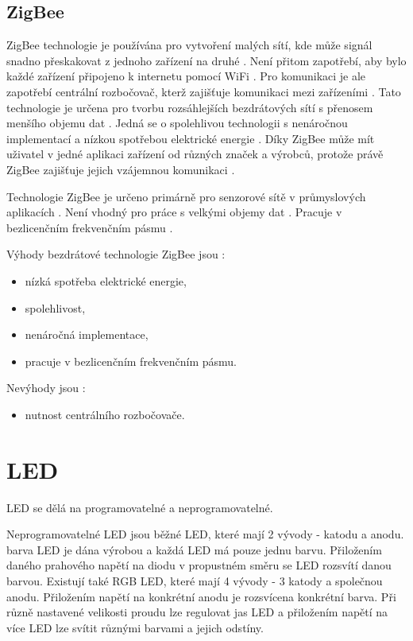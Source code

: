 \subsection{ZigBee}
ZigBee technologie je používána pro vytvoření malých sítí, kde může signál snadno přeskakovat z jednoho zařízení na druhé \cite{ZigBee_smart}.
Není přitom zapotřebí, aby bylo každé zařízení připojeno k internetu pomocí WiFi \cite{ZigBee_smart}. Pro komunikaci je ale zapotřebí centrální 
rozbočovač, kterž zajišťuje komunikaci mezi zařízeními \cite{ZigBee_smart}. Tato technologie je určena pro tvorbu rozsáhlejších bezdrátových sítí
s přenosem menšího objemu dat \cite{ZigBee_smart}. Jedná se o spolehlivou technologii s nenáročnou implementací a nízkou spotřebou elektrické energie 
\cite{ZigBee_smart}. Díky ZigBee může mít uživatel v jedné aplikaci zařízení 
od různých značek a výrobců, protože právě ZigBee zajišťuje jejich vzájemnou komunikaci \cite{ZigBee_smart}.

Technologie ZigBee je určeno primárně pro senzorové sítě v průmyslových aplikacích \cite{Bezdrat_muni}. Není vhodný pro práce s velkými objemy dat \cite{Bezdrat_muni}.
Pracuje v bezlicenčním frekvenčním pásmu \cite{Bezdrat_muni}.

Výhody bezdrátové technologie ZigBee jsou \cite{ZigBee_smart}:
\begin{itemize}
  \item nízká spotřeba elektrické energie,
  \item spolehlivost, 
  \item nenáročná implementace,
  \item pracuje v bezlicenčním frekvenčním pásmu. 
\end{itemize}

Nevýhody jsou \cite{ZigBee_smart}:
\begin{itemize}
  \item nutnost centrálního rozbočovače.
\end{itemize}

\section{LED}
LED se dělá na programovatelné a neprogramovatelné. 

Neprogramovatelné LED jsou běžné LED, které mají 2 vývody - katodu a anodu. barva LED je dána výrobou a každá LED má pouze jednu 
barvu. Přiložením daného prahového napětí na diodu v propustném směru se LED rozsvítí danou barvou. Existují také RGB LED, které 
mají 4 vývody - 3 katody a společnou anodu. Přiložením napětí na konkrétní anodu je rozsvícena konkrétní barva. Při různě nastavené
velikosti proudu lze regulovat jas LED a přiložením napětí na více LED lze svítit různými barvami a jejich odstíny. 

